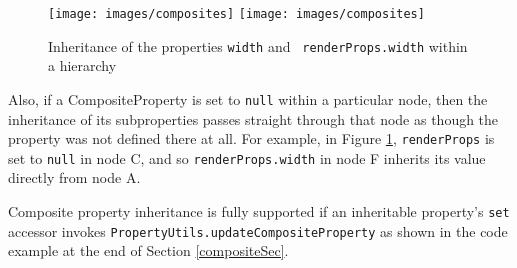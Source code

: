 \begin{figure}
\begin{center}
\iflatexml
\texttt{[image: images/composites]}
\else
\texttt{[image: images/composites]}
\fi
\end{center}
\caption{Inheritance of the properties {\tt width} and {\tt
renderProps.width} within a hierarchy}%
\label{compositesFig}
\end{figure}

Also, if a CompositeProperty is set to {\tt null} within a particular
node, then the inheritance of its subproperties passes straight
through that node as though the property was not defined there at
all. For example, in Figure \ref{compositesFig}, {\tt renderProps} is
set to {\tt null} in node C, and so {\tt renderProps.width} in node F
inherits its value directly from node A.

Composite property inheritance is fully supported if an inheritable
property's {\tt set} accessor invokes 
{\tt PropertyUtils.update\-CompositeProperty} as shown in the code example at
the end of Section \ref{compositeSec}.

